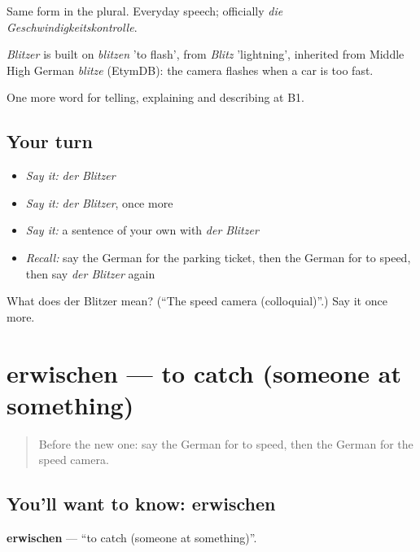 Same form in the plural. Everyday speech; officially \emph{die Geschwindigkeitskontrolle}.

\begin{cousinweb}
\emph{Blitzer} is built on \emph{blitzen} 'to flash', from \emph{Blitz} 'lightning', inherited from Middle High German \emph{blitze} (EtymDB): the camera flashes when a car is too fast.
\end{cousinweb}

\begin{grammarlens}[title={What you've built}]
One more word for telling, explaining and describing at B1.
\end{grammarlens}

\subsection*{Your turn}
\begin{itemize}
\raggedright
  \item \emph{Say it:} \emph{der Blitzer}
  \item \emph{Say it:} \emph{der Blitzer}, once more
  \item \emph{Say it:} a sentence of your own with \emph{der Blitzer}
  \item \emph{Recall:} say the German for the parking ticket, then the German for to speed, then say \emph{der Blitzer} again
\end{itemize}

\begin{tcolorbox}[breakable,colback=teal!4,colframe=teal!35!black,title={Before you move on}]
What does der Blitzer mean? (\textquotedblleft{}The speed camera (colloquial)\textquotedblright{}.) Say it once more.
\end{tcolorbox}
\section[erwischen]{erwischen — to catch (someone at something)}

\label{lesson:GE-C407-erwischen}



\begin{quote}
Before the new one: say the German for to speed, then the German for the speed camera.
\end{quote}

\subsection*{You'll want to know: erwischen}
\textbf{erwischen} — \textquotedblleft{}to catch (someone at something)\textquotedblright{}.

